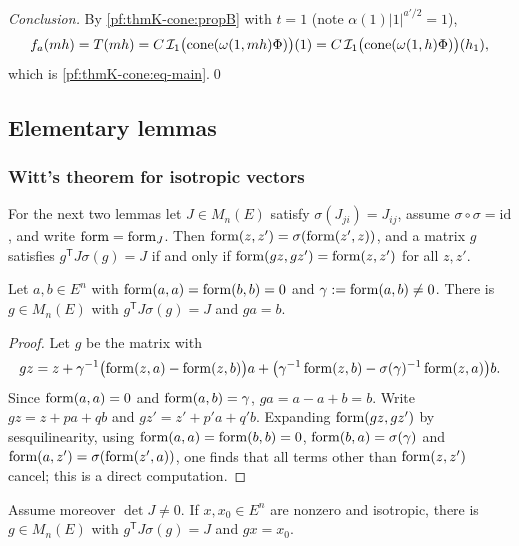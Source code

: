 \emph{Conclusion.}  By \cref{pf:thmK-cone:propB} with $t=1$ (note $\alpha(1)|1|^{a'/2}=1$),
\[
  f_a(mh)=T(mh)=C\,\mathcal{I}_1\bigl(\operatorname{cone}(\omega(1,mh)\Phi)\bigr)(1)
  =C\,\mathcal{I}_1\bigl(\operatorname{cone}(\omega(1,h)\Phi)\bigr)(h_1),
\]
which is \eqref{pf:thmK-cone:eq-main}.\qed

\subsection{Elementary lemmas}\label{pf:thmK-cone:elementary}

\subsubsection{Witt's theorem for isotropic vectors}
For the next two lemmas let $J\in M_n(E)$ satisfy $\sigma(J_{ji})=J_{ij}$, assume $\sigma\circ\sigma=\mathrm{id}$, and write
$\operatorname{form}=\operatorname{form}_J$.  Then $\operatorname{form}(z,z')=\sigma(\operatorname{form}(z',z))$, and a matrix $g$ satisfies
$g^{\mathsf T}J\sigma(g)=J$ if and only if $\operatorname{form}(gz,gz')=\operatorname{form}(z,z')$ for all $z,z'$.

\begin{lemma}\label{pf:thmK-cone:swap}
Let $a,b\in E^n$ with $\operatorname{form}(a,a)=\operatorname{form}(b,b)=0$ and $\gamma:=\operatorname{form}(a,b)\neq0$.  There is $g\in M_n(E)$
with $g^{\mathsf T}J\sigma(g)=J$ and $ga=b$.
\end{lemma}

\begin{proof}
Let $g$ be the matrix with
\[
  gz=z+\gamma^{-1}\bigl(\operatorname{form}(z,a)-\operatorname{form}(z,b)\bigr)a
     +\bigl(\gamma^{-1}\operatorname{form}(z,b)-\sigma(\gamma)^{-1}\operatorname{form}(z,a)\bigr)b .
\]
Since $\operatorname{form}(a,a)=0$ and $\operatorname{form}(a,b)=\gamma$, $ga=a-a+b=b$.  Write $gz=z+pa+qb$ and $gz'=z'+p'a+q'b$.
Expanding $\operatorname{form}(gz,gz')$ by sesquilinearity, using $\operatorname{form}(a,a)=\operatorname{form}(b,b)=0$,
$\operatorname{form}(b,a)=\sigma(\gamma)$ and $\operatorname{form}(a,z')=\sigma(\operatorname{form}(z',a))$, one finds that all terms
other than $\operatorname{form}(z,z')$ cancel; this is a direct computation.
\end{proof}

\begin{lemma}[Witt]\label{pf:thmK-cone:witt}
Assume moreover $\det J\neq0$.  If $x,x_0\in E^n$ are nonzero and isotropic, there is $g\in M_n(E)$ with
$g^{\mathsf T}J\sigma(g)=J$ and $gx=x_0$.
\end{lemma}

